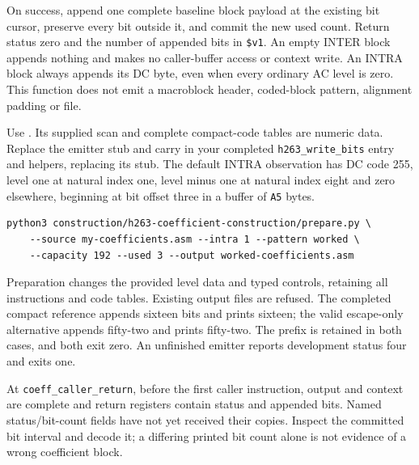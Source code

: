 On success, append one complete baseline block payload at the existing bit cursor,
preserve every bit outside it, and commit the new used count. Return status zero
and the number of appended bits in \texttt{\$v1}. An empty INTER block appends
nothing and makes no caller-buffer access or context write. An INTRA block always
appends its DC byte, even when every ordinary AC level is zero. This function
does not emit a macroblock header, coded-block pattern, alignment padding or file.

Use . Its supplied scan and
complete compact-code tables are numeric data. Replace the emitter stub and carry
in your completed \texttt{h263\_write\_bits} entry and helpers, replacing its stub.
The default INTRA observation has DC code 255, level one at natural index one,
level minus one at natural index eight and zero elsewhere, beginning at bit offset
three in a buffer of \texttt{A5} bytes.
\begin{verbatim}
python3 construction/h263-coefficient-construction/prepare.py \
    --source my-coefficients.asm --intra 1 --pattern worked \
    --capacity 192 --used 3 --output worked-coefficients.asm
\end{verbatim}
Preparation changes the provided level data and typed controls, retaining all
instructions and code tables. Existing output files are refused. The completed
compact reference appends sixteen bits and prints sixteen; the valid escape-only
alternative appends fifty-two and prints fifty-two. The prefix is retained in
both cases, and both exit zero. An unfinished emitter reports development status
four and exits one.

At \texttt{coeff\_caller\_return}, before the first caller instruction, output
and context are complete and return registers contain status and appended bits.
Named status/bit-count fields have not yet received their copies. Inspect the
committed bit interval and decode it; a differing printed bit count alone is
not evidence of a wrong coefficient block.
